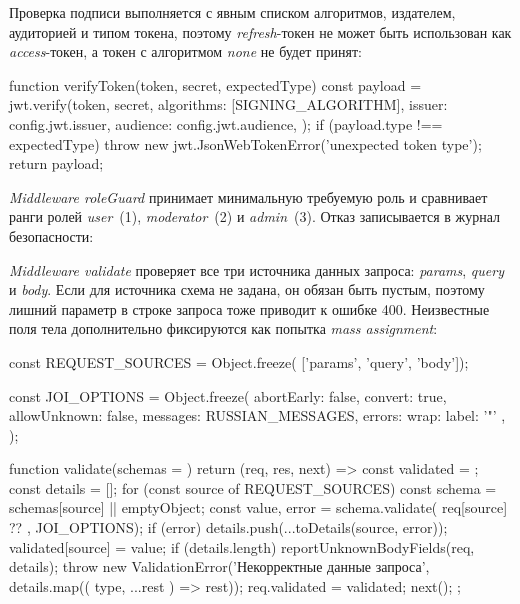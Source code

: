 \documentclass{stp}
\begin{document}
Проверка подписи
выполняется с явным списком алгоритмов, издателем, аудиторией и типом
токена, поэтому \textit{refresh}-токен не может быть использован как \textit{access}-токен,
а токен с алгоритмом \textit{none} не будет принят:

\begin{stplisting}
function verifyToken(token, secret, expectedType) {
  const payload = jwt.verify(token, secret, {
    algorithms: [SIGNING_ALGORITHM],
    issuer: config.jwt.issuer,
    audience: config.jwt.audience,
  });
  if (payload.type !== expectedType) {
    throw new jwt.JsonWebTokenError('unexpected token type');
  }
  return payload;
}
\end{stplisting}

\textit{Middleware roleGuard} принимает минимальную требуемую роль и сравнивает
ранги ролей \textit{user}~(1), \textit{moderator}~(2) и \textit{admin}~(3). Отказ записывается в
журнал безопасности:


\textit{Middleware validate} проверяет все три источника данных запроса: \textit{params},
\textit{query} и \textit{body}. Если для источника схема не задана, он обязан быть пустым,
поэтому лишний параметр в строке запроса тоже приводит к ошибке 400.
Неизвестные поля тела дополнительно фиксируются как попытка \textit{mass assignment}:

\begin{stplisting}
const REQUEST_SOURCES = Object.freeze(
  ['params', 'query', 'body']);

const JOI_OPTIONS = Object.freeze({
  abortEarly: false,
  convert: true,
  allowUnknown: false,
  messages: RUSSIAN_MESSAGES,
  errors: { wrap: { label: '"' } },
});

function validate(schemas = {}) {
  return (req, res, next) => {
    const validated = {};
    const details = [];
    for (const source of REQUEST_SOURCES) {
      const schema = schemas[source] || emptyObject;
      const { value, error } = schema.validate(
        req[source] ?? {}, JOI_OPTIONS);
      if (error) {
        details.push(...toDetails(source, error));
      }
      validated[source] = value;
    }
    if (details.length) {
      reportUnknownBodyFields(req, details);
      throw new ValidationError('Некорректные данные запроса',
        details.map(({ type, ...rest }) => rest));
    }
    req.validated = validated;
    next();
  };
}
\end{stplisting}
\end{document}
